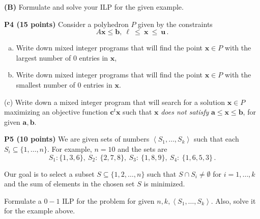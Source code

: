 \documentclass[11pt]{article}
\begin{document}
\noindent\textbf{(B)} Formulate and solve your ILP for the given example.

\medskip

\noindent\textbf{P4 (15 points)} Consider a polyhedron $P$ given
by the constraints
 \[ A \mathbf{x} \leq \mathbf{b},\ \mathbf{\ell}\ \leq\ \mathbf{x}\ \leq\ \mathbf{u}\,. \]


\begin{enumerate}[(a)]
\item  Write down mixed integer programs that will find the
point $\mathbf{x} \in P$ with the largest number of
$0$ entries in $\mathbf{x}$, 
\item Write down mixed integer programs that will find the
point $\mathbf{x} \in P$ with the smallest number of $0$ entries in $\mathbf{x}$.
\end{enumerate}

\noindent (c) Write down a mixed integer program that will search for a solution
$\mathbf{x} \in P$ maximizing an objective function $\mathbf{c}^t \mathbf{x}$ 
such that $\mathbf{x}$ \emph{does not satisfy}
$\mathbf{a} \leq \mathbf{x} \leq \mathbf{b}$, for given $\mathbf{a}, \mathbf{b}$.

\medskip

\noindent\textbf{P5 (10 points)} We are given  sets of numbers
$\left\langle{S_1,\ldots,S_k}\right\rangle$ such that each $S_i \subseteq \{1,\ldots, n\}$.
For example, $n = 10$ and the sets are
\[ S_1: \{ 1,3,6\},\ S_2:\ \{2, 7, 8\},\ S_3:\ \{1,8,9\},\ S_4:\ \{1,6,5,3\} \,.\]

Our goal is to select a subset $S \subseteq \{ 1, 2, \ldots, n\}$ such that 
$S \cap S_i \not= \emptyset$ for $i = 1,\ldots, k$ and the sum of elements
in the chosen set $S$ is minimized.

Formulate a $0-1$ ILP for the problem for given $n, k, \left\langle{S_1,\ldots,S_k}\right\rangle$. Also,
 solve it for the example above.
\end{document}
